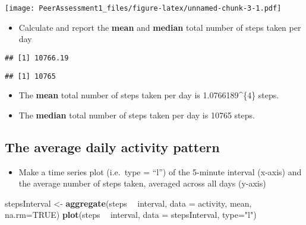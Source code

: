 \documentclass[]{article}
\newenvironment{Shaded}{\begin{snugshade}}{\end{snugshade}}
\newcommand{\KeywordTok}[1]{\textcolor[rgb]{0.13,0.29,0.53}{\textbf{#1}}}
\newcommand{\DataTypeTok}[1]{\textcolor[rgb]{0.13,0.29,0.53}{#1}}
\newcommand{\StringTok}[1]{\textcolor[rgb]{0.31,0.60,0.02}{#1}}
\newcommand{\OtherTok}[1]{\textcolor[rgb]{0.56,0.35,0.01}{#1}}
\newcommand{\OperatorTok}[1]{\textcolor[rgb]{0.81,0.36,0.00}{\textbf{#1}}}
\newcommand{\NormalTok}[1]{#1}
\providecommand{\tightlist}{%
  \setlength{\itemsep}{0pt}\setlength{\parskip}{0pt}}
\begin{document}
\texttt{[image: PeerAssessment1\_files/figure-latex/unnamed-chunk-3-1.pdf]}

\begin{itemize}
\tightlist
\item
  Calculate and report the \textbf{mean} and \textbf{median} total
  number of steps taken per day
\end{itemize}

\begin{Shaded}
\end{Shaded}

\begin{verbatim}
## [1] 10766.19
\end{verbatim}

\begin{Shaded}
\end{Shaded}

\begin{verbatim}
## [1] 10765
\end{verbatim}

\begin{itemize}
\item
  The \textbf{mean} total number of steps taken per day is
  1.0766189\^{}\{4\} steps.
\item
  The \textbf{median} total number of steps taken per day is 10765
  steps.
\end{itemize}

\subsection{The average daily activity
pattern}\label{the-average-daily-activity-pattern}

\begin{itemize}
\tightlist
\item
  Make a time series plot (i.e.~type = ``l'') of the 5-minute interval
  (x-axis) and the average number of steps taken, averaged across all
  days (y-axis)
\end{itemize}

\begin{Shaded}
\begin{Highlighting}[]
\NormalTok{stepsInterval <-}\StringTok{ }\KeywordTok{aggregate}\NormalTok{(steps }\OperatorTok{~}\StringTok{ }\NormalTok{interval, }\DataTypeTok{data =}\NormalTok{ activity, mean, }\DataTypeTok{na.rm=}\OtherTok{TRUE}\NormalTok{)}
\KeywordTok{plot}\NormalTok{(steps }\OperatorTok{~}\StringTok{ }\NormalTok{interval, }\DataTypeTok{data =}\NormalTok{ stepsInterval, }\DataTypeTok{type=}\StringTok{"l"}\NormalTok{)}
\end{Highlighting}
\end{Shaded}
\end{document}
